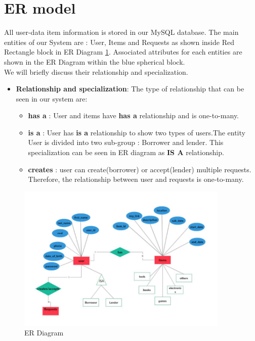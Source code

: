 \documentclass[a4paper]{article}
\begin{document}
\section{ER model} All user-data item information is stored in our MySQL database. The main entities of our System are : User, Items and Requests as shown inside Red Rectangle block in ER Diagram \ref{ERDiagram}.  Associated attributes for each entities are shown in the ER Diagram within the blue spherical block. \\  We will briefly discuss their relationship and specialization. 
\begin{itemize}
\item \textbf{Relationship and specialization}: The type of relationship that can be seen in our system are: 
\begin{itemize}
\item \textbf{has a} : User and items have \textbf{has a} relationship and is one-to-many.
\item \textbf{is a} : User has \textbf{is a} relationship to show two types of users.The entity User is divided into two sub-group : Borrower and lender. This specialization can be seen in ER diagram as \textbf{IS A} relationship.
\item \textbf{creates} : user can create(borrower) or accept(lender) multiple requests. Therefore, the relationship between user and requests is one-to-many.
\end{itemize}

\end{itemize}
\begin{figure}[H] 
  \centering
  \includegraphics[width=0.9\textwidth]{ERfinal.PNG}\hfill
  \caption{ER Diagram}\label{ERDiagram}
\end{figure}
\end{document}
